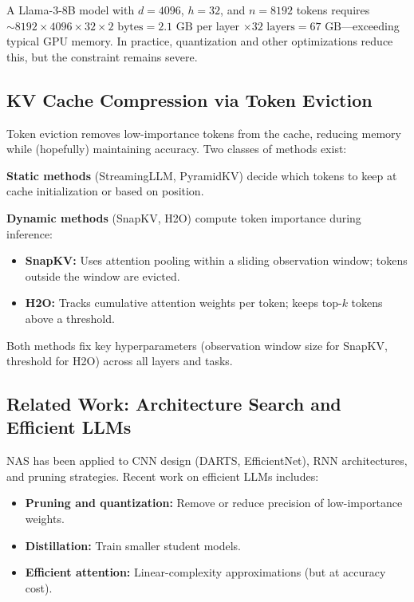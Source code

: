 \documentclass[11pt,a4paper]{article}
\begin{document}
A Llama-3-8B model with $d=4096$, $h=32$, and $n=8192$ tokens requires $\sim 8192 \times 4096 \times 32 \times 2 \text{ bytes} = 2.1\text{ GB}$ per layer $\times 32 \text{ layers} = 67\text{ GB}$—exceeding typical GPU memory. In practice, quantization and other optimizations reduce this, but the constraint remains severe.

\subsection{KV Cache Compression via Token Eviction}

Token eviction removes low-importance tokens from the cache, reducing memory while (hopefully) maintaining accuracy. Two classes of methods exist:

\textbf{Static methods} (StreamingLLM, PyramidKV) decide which tokens to keep at cache initialization or based on position.

\textbf{Dynamic methods} (SnapKV, H2O) compute token importance during inference:
\begin{itemize}
    \item \textbf{SnapKV:} Uses attention pooling within a sliding observation window; tokens outside the window are evicted.
    \item \textbf{H2O:} Tracks cumulative attention weights per token; keeps top-$k$ tokens above a threshold.
\end{itemize}

Both methods fix key hyperparameters (observation window size for SnapKV, threshold for H2O) across all layers and tasks.

\subsection{Related Work: Architecture Search and Efficient LLMs}

NAS has been applied to CNN design (DARTS, EfficientNet), RNN architectures, and pruning strategies. Recent work on efficient LLMs includes:
\begin{itemize}
    \item \textbf{Pruning and quantization:} Remove or reduce precision of low-importance weights.
    \item \textbf{Distillation:} Train smaller student models.
    \item \textbf{Efficient attention:} Linear-complexity approximations (but at accuracy cost).
\end{itemize}
\end{document}
